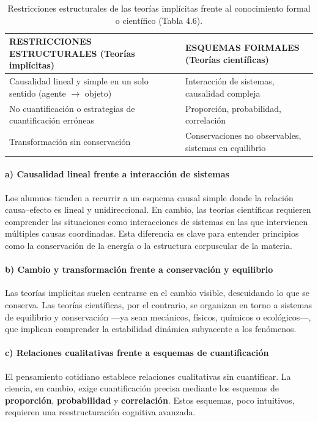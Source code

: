 \documentclass{article}
\begin{document}
\begin{table}[H]
\centering
\caption{Restricciones estructurales de las teorías implícitas frente al conocimiento formal o científico (Tabla 4.6).}
\begin{tabular}{|p{6cm}|p{6cm}|}
\hline
\textbf{RESTRICCIONES ESTRUCTURALES (Teorías implícitas)} & 
\textbf{ESQUEMAS FORMALES (Teorías científicas)} \\ \hline
Causalidad lineal y simple en un solo sentido (agente $\rightarrow$ objeto) & 
Interacción de sistemas, causalidad compleja \\ \hline
No cuantificación o estrategias de cuantificación erróneas & 
Proporción, probabilidad, correlación \\ \hline
Transformación sin conservación & 
Conservaciones no observables, sistemas en equilibrio \\ \hline
\end{tabular}
\end{table}

\paragraph{a) Causalidad lineal frente a interacción de sistemas}
Los alumnos tienden a recurrir a un esquema causal simple donde la relación causa–efecto es lineal y unidireccional. En cambio, las teorías científicas requieren comprender las situaciones como interacciones de sistemas en las que intervienen múltiples causas coordinadas. Esta diferencia es clave para entender principios como la conservación de la energía o la estructura corpuscular de la materia.

\paragraph{b) Cambio y transformación frente a conservación y equilibrio}
Las teorías implícitas suelen centrarse en el cambio visible, descuidando lo que se conserva. Las teorías científicas, por el contrario, se organizan en torno a sistemas de equilibrio y conservación —ya sean mecánicos, físicos, químicos o ecológicos—, que implican comprender la estabilidad dinámica subyacente a los fenómenos.

\paragraph{c) Relaciones cualitativas frente a esquemas de cuantificación}
El pensamiento cotidiano establece relaciones cualitativas sin cuantificar. La ciencia, en cambio, exige cuantificación precisa mediante los esquemas de \textbf{proporción}, \textbf{probabilidad} y \textbf{correlación}. Estos esquemas, poco intuitivos, requieren una reestructuración cognitiva avanzada.
\end{document}
